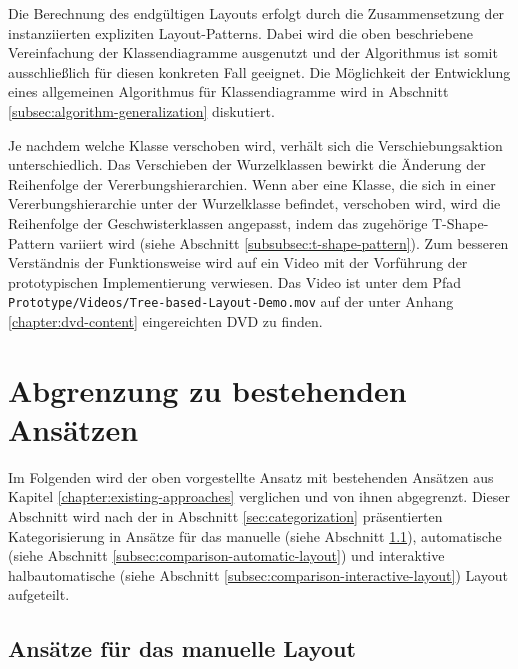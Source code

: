 Die Berechnung des endgültigen Layouts erfolgt durch die Zusammensetzung der instanziierten expliziten Layout-Patterns. Dabei wird die oben beschriebene Vereinfachung der Klassendiagramme ausgenutzt und der Algorithmus ist somit ausschließlich für diesen konkreten Fall geeignet. Die Möglichkeit der Entwicklung eines allgemeinen Algorithmus für Klassendiagramme wird in Abschnitt \ref{subsec:algorithm-generalization} diskutiert.

Je nachdem welche Klasse verschoben wird, verhält sich die Verschiebungsaktion unterschiedlich. Das Verschieben der Wurzelklassen bewirkt die Änderung der Reihenfolge der Vererbungshierarchien. Wenn aber eine Klasse, die sich in einer Vererbungshierarchie unter der Wurzelklasse befindet, verschoben wird, wird die Reihenfolge der Geschwisterklassen angepasst, indem das zugehörige T-Shape-Pattern variiert wird (siehe Abschnitt \ref{subsubsec:t-shape-pattern}). Zum besseren Verständnis der Funktionsweise wird auf ein Video mit der Vorführung der prototypischen Implementierung verwiesen. Das Video ist unter dem Pfad \texttt{Prototype/Videos/Tree-based-Layout-\-De\-mo.mov} auf der unter Anhang \ref{chapter:dvd-content} eingereichten DVD zu finden.


\section{Abgrenzung zu bestehenden Ansätzen}
\label{sec:current-approaches-comparison}

Im Folgenden wird der oben vorgestellte Ansatz mit bestehenden Ansätzen aus Kapitel \ref{chapter:existing-approaches} verglichen und von ihnen abgegrenzt. Dieser Abschnitt wird nach der in Abschnitt \ref{sec:categorization} präsentierten Kategorisierung in Ansätze für das manuelle (siehe Abschnitt \ref{subsec:comparison-manual-layout}), automatische (siehe Abschnitt \ref{subsec:comparison-automatic-layout}) und interaktive halbautomatische (siehe Abschnitt \ref{subsec:comparison-interactive-layout}) Layout aufgeteilt.

\subsection{Ansätze für das manuelle Layout}
\label{subsec:comparison-manual-layout}

